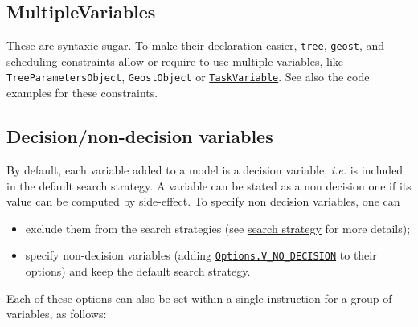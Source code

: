 
\subsection{MultipleVariables}\label{model:multiplevariables}\hypertarget{model:multiplevariables}{}
These are syntaxic sugar. To make their declaration easier, \hyperlink{tree:treeconstraint}{\tt tree}, \hyperlink{geost:geostconstraint}{\tt geost}, and scheduling constraints allow or require to use multiple variables, like \texttt{TreeParametersObject}, \texttt{GeostObject} or \hyperlink{taskvariable}{\tt TaskVariable}.
See also the code examples for these constraints.


\subsection{Decision/non-decision variables}\label{model:decisionvariables}\hypertarget{model:decisionvariables}{}

By default, each variable added to a model is a decision variable, \textit{i.e.} is included in the default search strategy. A variable can be stated as a non decision one if its value can be computed by side-effect. To specify non decision variables, one can 
\begin{itemize}
\item exclude them from the search strategies (see \hyperlink{solver:searchstrategy}{search strategy} for more details);
\item specify non-decision variables (adding \hyperlink{vnodecision:vnodecisionoptions}{\tt Options.V\_NO\_DECISION} to their options) and keep the default search strategy.
\end{itemize}

Each of these options can also be set within a single instruction for a group of variables, as follows: 


